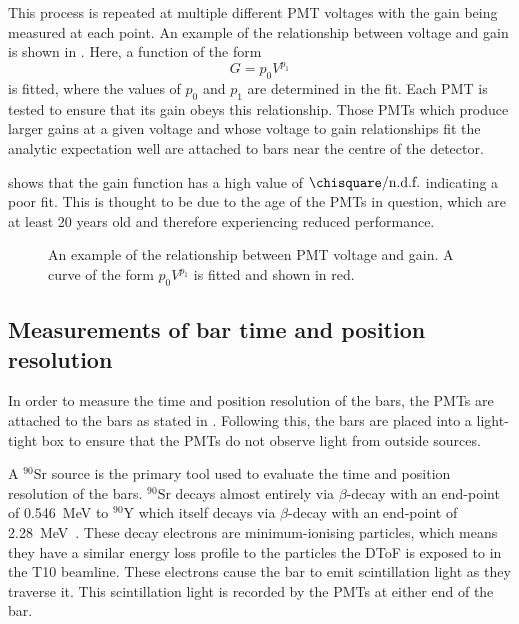 This process is repeated at multiple different PMT voltages with the gain being measured at each point.
An example of the relationship between voltage and gain is shown in .
Here, a function of the form
\begin{equation}
  G = p_{0} V^{p_{1}}
  \label{eq:gain}
\end{equation}
is fitted, where the values of $p_{0}$ and $p_{1}$ are determined in the fit.
Each PMT is tested to ensure that its gain obeys this relationship.
Those PMTs which produce larger gains at a given voltage and whose voltage to gain relationships fit the analytic expectation well are attached to bars near the centre of the detector.

 shows that the gain function has a high value of $\chisquare / \text{n.d.f.}$ indicating a poor fit.
This is thought to be due to the age of the PMTs in question, which are at least 20 years old and therefore experiencing reduced performance.

\begin{figure}[h]
  \centering
  \begin{adjustbox}{max totalsize={.8\textwidth}, center}
    
  \end{adjustbox}
  \caption[Example of relationship between PMT voltage and gain.]{An example of the relationship between PMT voltage and gain. A curve of the form $p_{0} V^{p_{1}}$ is fitted and shown in red.}
  \label{fig:gainEx}
\end{figure}

\subsection{Measurements of bar time and position resolution}
\label{sec:hptpc_dtof_characterisation:characterisation:barRes}

In order to measure the time and position resolution of the bars, the PMTs are attached to the bars as stated in .
Following this, the bars are placed into a light-tight box to ensure that the PMTs do not observe light from outside sources.

A $^{90}\text{Sr}$ source is the primary tool used to evaluate the time and position resolution of the bars.
$^{90}\text{Sr}$ decays almost entirely via $\beta$-decay with an end-point of \SI{0.546}{\mega\electronvolt} to $^{90}\text{Y}$ which itself decays via $\beta$-decay with an end-point of \SI{2.28}{\mega\electronvolt}~\cite{strontium}.
These decay electrons are minimum-ionising particles, which means they have a similar energy loss profile to the particles the DToF is exposed to in the T10 beamline.
These electrons cause the bar to emit scintillation light as they traverse it.
This scintillation light is recorded by the PMTs at either end of the bar.

